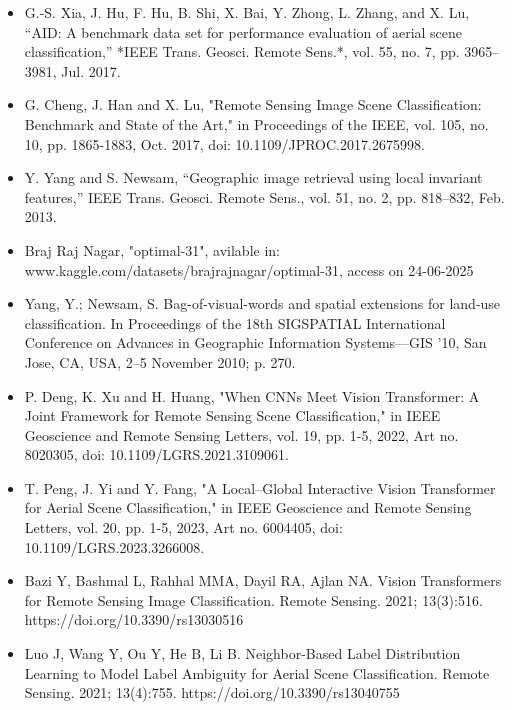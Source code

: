 \begin{itemize}
        \item G.-S. Xia, J. Hu, F. Hu, B. Shi, X. Bai, Y. Zhong, L. Zhang, and X. Lu, ``AID: A benchmark data set for performance evaluation of aerial scene classification,'' *IEEE Trans. Geosci. Remote Sens.*, vol. 55, no. 7, pp. 3965--3981, Jul. 2017.

    \item G. Cheng, J. Han and X. Lu, "Remote Sensing Image Scene Classification: Benchmark and State of the Art," in Proceedings of the IEEE, vol. 105, no. 10, pp. 1865-1883, Oct. 2017, doi: 10.1109/JPROC.2017.2675998.

    \item Y. Yang and S. Newsam, “Geographic image retrieval using local invariant features,” IEEE Trans. Geosci. Remote Sens., vol. 51, no. 2, pp. 818–832, Feb. 2013.

    \item Braj Raj Nagar, "optimal-31", avilable in: www.kaggle.com/datasets/brajrajnagar/optimal-31, access on 24-06-2025

    \item Yang, Y.; Newsam, S. Bag-of-visual-words and spatial extensions for land-use classification. In Proceedings of the 18th SIGSPATIAL International Conference on Advances in Geographic Information Systems—GIS ’10, San Jose, CA, USA, 2–5 November 2010; p. 270.

    \item P. Deng, K. Xu and H. Huang, "When CNNs Meet Vision Transformer: A Joint Framework for Remote Sensing Scene Classification," in IEEE Geoscience and Remote Sensing Letters, vol. 19, pp. 1-5, 2022, Art no. 8020305, doi: 10.1109/LGRS.2021.3109061.

    \item T. Peng, J. Yi and Y. Fang, "A Local–Global Interactive Vision Transformer for Aerial Scene Classification," in IEEE Geoscience and Remote Sensing Letters, vol. 20, pp. 1-5, 2023, Art no. 6004405, doi: 10.1109/LGRS.2023.3266008.
    
    \item Bazi Y, Bashmal L, Rahhal MMA, Dayil RA, Ajlan NA. Vision Transformers for Remote Sensing Image Classification. Remote Sensing. 2021; 13(3):516. https://doi.org/10.3390/rs13030516 
    
    \item Luo J, Wang Y, Ou Y, He B, Li B. Neighbor-Based Label Distribution Learning to Model Label Ambiguity for Aerial Scene Classification. Remote Sensing. 2021; 13(4):755. https://doi.org/10.3390/rs13040755 


\end{itemize}
